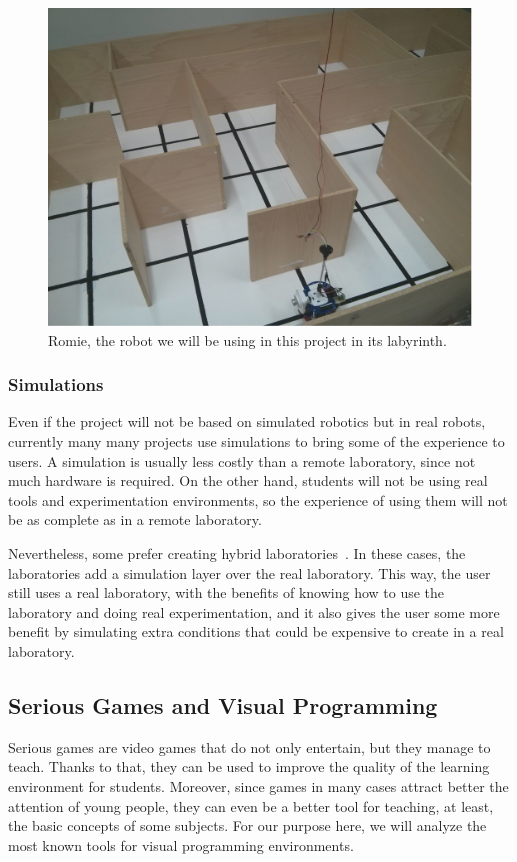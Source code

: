 \begin{figure}[!htbp]
	\centering
	\includegraphics[width=.4\textwidth]{fig/labyrinth}
	\caption{Romie, the robot we will be using in this project in its labyrinth.}\label{fig:labyrinth}
\end{figure}

\subsubsection{Simulations}

Even if the project will not be based on simulated robotics but in real robots, currently many
many projects use simulations to bring some of the experience to users. A simulation is usually
less costly than a remote laboratory, since not much hardware is required. On the other hand,
students will not be using real tools and experimentation environments, so the experience of using
them will not be as complete as in a remote laboratory.

Nevertheless, some prefer creating hybrid laboratories~\cite{hybrid_labs}. In these cases, the
laboratories add a simulation layer over the real laboratory. This way, the user still uses a real
laboratory, with the benefits of knowing how to use the laboratory and doing real experimentation,
and it also gives the user some more benefit by simulating extra conditions that could be expensive
to create in a real laboratory.

\subsection{Serious Games and Visual Programming}

Serious games are video games that do not only entertain, but they manage to teach. Thanks to that,
they can be used to improve the quality of the learning environment for students. Moreover, since
games in many cases attract better the attention of young people, they can even be a better tool for
teaching, at least, the basic concepts of some subjects. For our purpose here, we will analyze the
most known tools for visual programming environments.

